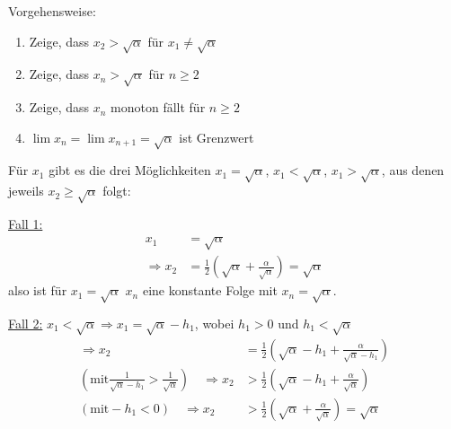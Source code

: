 \bigskip

\begin{lsg}  

Vorgehensweise:
\begin{enumerate}
    \item Zeige, dass $x_2 > \sqrt{\alpha}$ für $x_1 \neq \sqrt{\alpha}$
    \item Zeige, dass $x_n > \sqrt{\alpha}$ für $n \geq 2$
    \item Zeige, dass $x_n$ monoton fällt für $n \geq 2$
    \item $\lim x_n = \lim x_{n+1} = \sqrt{\alpha}$ ist Grenzwert
\end{enumerate}

Für $x_1$ gibt es die drei Möglichkeiten $x_1 = \sqrt{\alpha}$, $x_1 < \sqrt{\alpha}$, $x_1 > \sqrt{\alpha}$, aus denen jeweils $x_2 \geq \sqrt{\alpha}$ folgt:

\noindent
\underline{Fall 1:} 
\begin{align*}
x_1 &= \sqrt{\alpha} \\
\Rightarrow x_2 &= \frac{1}{2} \left( \sqrt{\alpha} + \frac{\alpha}{\sqrt{\alpha}} \right) = \sqrt{\alpha}
\end{align*}
 also ist für $x_1 = \sqrt{\alpha}$ $x_n$ eine konstante Folge mit $x_n = \sqrt{\alpha}$.

\noindent
\underline{Fall 2:} $x_1 < \sqrt{\alpha} \Rightarrow x_1 = \sqrt{\alpha} - h_1$, wobei $h_1 > 0$ und $h_1 < \sqrt\alpha$
\begin{align*}
\Rightarrow x_2 &= \frac{1}{2} \left( \sqrt{\alpha} - h_1 + \frac{\alpha}{\sqrt{\alpha} - h_1} \right) \\
\left(\text{mit} \frac{1}{\sqrt{\alpha} - h_1} > \frac{1}{\sqrt{\alpha}}\right)\quad \Rightarrow x_2 &> \frac{1}{2} \left( \sqrt{\alpha} - h_1 + \frac{\alpha}{\sqrt{\alpha}} \right) \\
(\text{mit} -h_1 < 0)\quad \Rightarrow x_2 &> \frac{1}{2} \left( \sqrt{\alpha} + \frac{\alpha}{\sqrt{\alpha}} \right) = \sqrt{\alpha}
\end{align*}



\end{lsg}
